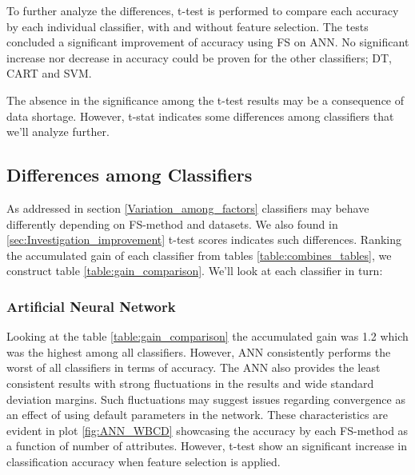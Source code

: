 To further analyze the differences, t-test is performed to compare each accuracy by each individual classifier, with and without feature selection. The tests concluded a significant improvement of accuracy using FS on ANN. No significant increase nor decrease in accuracy could be proven for the other classifiers; DT, CART and SVM.



The absence in the significance among the t-test results may be a consequence of data shortage. However, t-stat indicates some differences among classifiers that we'll analyze further.


\subsection{Differences among Classifiers}

As addressed in section \ref{Variation_among_factors} classifiers may behave differently depending on FS-method and datasets. We also found in \ref{sec:Investigation_improvement} t-test scores indicates such differences. Ranking the accumulated gain of each classifier from tables \ref{table:combines_tables}, we construct table \ref{table:gain_comparison}. We'll look at each classifier in turn:

\begin{table}[hp]
  
  \caption[]%
  {{\small Ranking of which classifiers gained most accuracy when comparing feature selection to full dataset.}}
  \label{table:gain_comparison}
\end{table}

\subsubsection{Artificial Neural Network}

Looking at the table \ref{table:gain_comparison} the accumulated gain was 1.2 which was the highest among all classifiers. However, ANN consistently performs the worst of all classifiers in terms of accuracy. The ANN also provides the least consistent results with strong fluctuations in the results and wide standard deviation margins. Such fluctuations may suggest issues regarding convergence as an effect of using default parameters in the network. These characteristics are evident in plot \ref{fig:ANN_WBCD} showcasing the accuracy by each FS-method as a function of number of attributes. However, t-test show an significant increase in classification accuracy when feature selection is applied.

